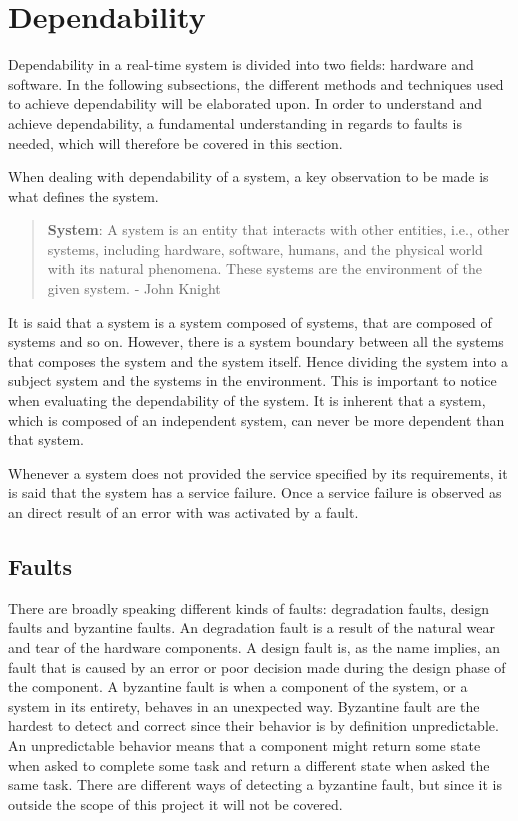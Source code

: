 \section{Dependability}
Dependability in a real-time system is divided into two fields: hardware and software. 
In the following subsections, the different methods and techniques used to achieve dependability will be elaborated upon.  
In order to understand and achieve dependability, a fundamental understanding in regards to faults is needed, which will therefore be covered in this section.

When dealing with dependability of a system, a key observation to be made is what defines the system. 
\begin{quote}
\textbf{System}: A system is an entity that interacts with other entities, i.e., other systems, including hardware, software, humans, and the physical world with its natural phenomena.
These systems are the environment of the given system. 
- John Knight \cite{FundementalsOfDependableComputingForSoftwareEngineers}
\end{quote}
It is said that a system is a system composed of systems, that are composed of systems and so on. 
However, there is a system boundary between all the systems that composes the system and the system itself. 
Hence dividing the system into a subject system and the systems in the environment. 
This is important to notice when evaluating the dependability of the system. 
It is inherent that a system, which is composed of an independent system, can never be more dependent than that system. 

Whenever a system does not provided the service specified by its requirements, it is said that the system has a service failure. 
Once a service failure is observed as an direct result of an error with was activated by a fault. 

\subsection{Faults}
There are broadly speaking different kinds of faults: degradation faults, design faults and byzantine faults. 
An degradation fault is a result of the natural wear and tear of the hardware components.
A design fault is, as the name implies, an fault that is caused by an error or poor decision made during the design phase of the component. 
A byzantine fault is when a component of the system, or a system in its entirety, behaves in an unexpected way. 
Byzantine fault are the hardest to detect and correct since their behavior is by definition unpredictable. 
An unpredictable behavior means that a component might return some state when asked to complete some task and return a different state when asked the same task. 
There are different ways of detecting a byzantine fault, but since it is outside the scope of this project it will not be covered. 

